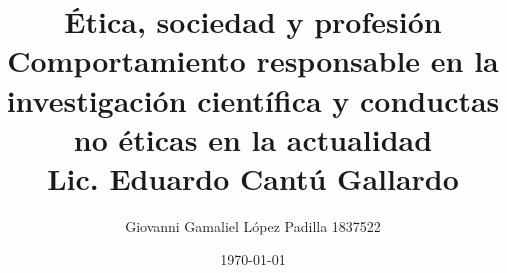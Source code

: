 \documentclass[aspectratio=169]{beamer}
\title[]{\changefontsizes{15pt}\textbf{Ética, sociedad y profesión}\\Comportamiento responsable en la investigación 
científica y conductas no éticas en la actualidad\\
Lic. Eduardo Cantú Gallardo}
\author{Giovanni Gamaliel López Padilla \hspace{1cm} 1837522}
\date{\today}
\begin{document}
\begin{frame}[plain]
\maketitle
\end{frame}




\end{document}

